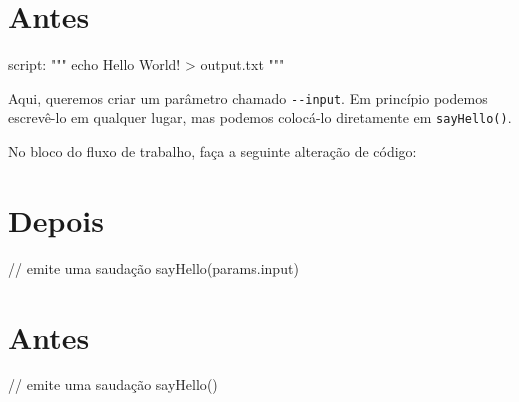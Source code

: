 \documentclass[
  brazilian,
  letterpaper,
  DIV=11,
  numbers=noendperiod]{scrreprt}
\newenvironment{Shaded}{\begin{snugshade}}{\end{snugshade}}
\newcommand{\CommentTok}[1]{\textcolor[rgb]{0.37,0.37,0.37}{#1}}
\newcommand{\FunctionTok}[1]{\textcolor[rgb]{0.28,0.35,0.67}{#1}}
\newcommand{\NormalTok}[1]{\textcolor[rgb]{0.00,0.23,0.31}{#1}}
\newcommand{\OperatorTok}[1]{\textcolor[rgb]{0.37,0.37,0.37}{#1}}
\newcommand{\SpecialStringTok}[1]{\textcolor[rgb]{0.13,0.47,0.30}{#1}}
\newcommand{\StringTok}[1]{\textcolor[rgb]{0.13,0.47,0.30}{#1}}
\begin{document}
\begin{Shaded}
\end{Shaded}

\section{Antes}

\begin{Shaded}
\begin{Highlighting}[]
\NormalTok{    script}\OperatorTok{:}
    \StringTok{"""}
\StringTok{    echo \textquotesingle{}Hello World!\textquotesingle{} \textgreater{} output.txt}
\StringTok{    """}
\end{Highlighting}
\end{Shaded}

Aqui, queremos criar um parâmetro chamado \texttt{-\/-input}. Em
princípio podemos escrevê-lo em qualquer lugar, mas podemos colocá-lo
diretamente em \texttt{sayHello()}.

No bloco do fluxo de trabalho, faça a seguinte alteração de código:

\section{Depois}

\begin{Shaded}
\begin{Highlighting}[]
    \CommentTok{// emite uma saudação}
    \FunctionTok{sayHello}\OperatorTok{(}\NormalTok{params}\OperatorTok{.}\NormalTok{input}\OperatorTok{)}
\end{Highlighting}
\end{Shaded}

\section{Antes}

\begin{Shaded}
\begin{Highlighting}[]
    \CommentTok{// emite uma saudação}
    \FunctionTok{sayHello}\OperatorTok{()}
\end{Highlighting}
\end{Shaded}
\end{document}
